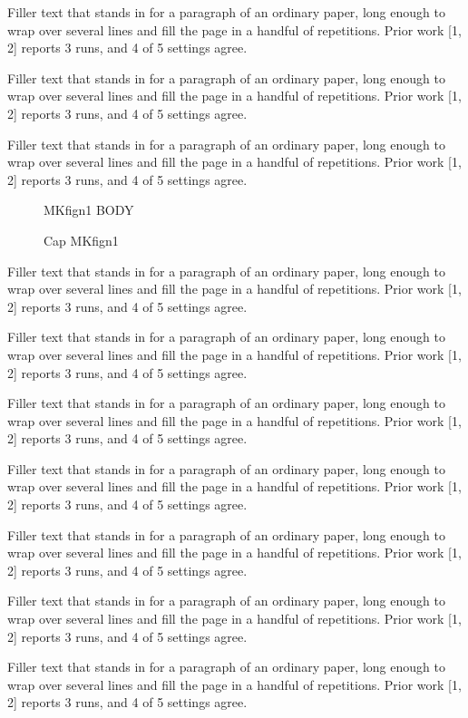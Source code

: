 \documentclass{article}
\begin{document}
Filler text that stands in for a paragraph of an ordinary paper, long enough to wrap over several lines and fill the page in a handful of repetitions. Prior work [1, 2] reports 3 runs, and 4 of 5 settings agree.\par
Filler text that stands in for a paragraph of an ordinary paper, long enough to wrap over several lines and fill the page in a handful of repetitions. Prior work [1, 2] reports 3 runs, and 4 of 5 settings agree.\par
Filler text that stands in for a paragraph of an ordinary paper, long enough to wrap over several lines and fill the page in a handful of repetitions. Prior work [1, 2] reports 3 runs, and 4 of 5 settings agree.\par
\begin{figure}[t]\centering MKfign1 BODY\caption{Cap MKfign1}\label{fig:n1}\end{figure}
Filler text that stands in for a paragraph of an ordinary paper, long enough to wrap over several lines and fill the page in a handful of repetitions. Prior work [1, 2] reports 3 runs, and 4 of 5 settings agree.\par
Filler text that stands in for a paragraph of an ordinary paper, long enough to wrap over several lines and fill the page in a handful of repetitions. Prior work [1, 2] reports 3 runs, and 4 of 5 settings agree.\par
Filler text that stands in for a paragraph of an ordinary paper, long enough to wrap over several lines and fill the page in a handful of repetitions. Prior work [1, 2] reports 3 runs, and 4 of 5 settings agree.\par
Filler text that stands in for a paragraph of an ordinary paper, long enough to wrap over several lines and fill the page in a handful of repetitions. Prior work [1, 2] reports 3 runs, and 4 of 5 settings agree.\par
Filler text that stands in for a paragraph of an ordinary paper, long enough to wrap over several lines and fill the page in a handful of repetitions. Prior work [1, 2] reports 3 runs, and 4 of 5 settings agree.\par
Filler text that stands in for a paragraph of an ordinary paper, long enough to wrap over several lines and fill the page in a handful of repetitions. Prior work [1, 2] reports 3 runs, and 4 of 5 settings agree.\par
Filler text that stands in for a paragraph of an ordinary paper, long enough to wrap over several lines and fill the page in a handful of repetitions. Prior work [1, 2] reports 3 runs, and 4 of 5 settings agree.\par
\end{document}
